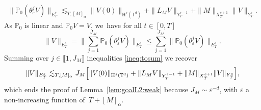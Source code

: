 \documentclass[JEP,XML,SOM,Unicode,published]{cedram}
\theoremstyle{definition}
\newcommand\T{\mathbb{T}}
\renewcommand\H{\mathrm{H}}
\let\ep\varepsilon
\begin{document}
\begin{align}\label{ineq:tosum}
\| \mathbb{P}_0(\theta_\ep^j V)\|_{E_T^s} \lesssim_{T,[M]_\alpha} \|V(0)\|_{\H^s(\T^d)} + \|L_M V\|_{Y_T^{s-1}} + \|M\|_{X_T^{s+1}}\|V\|_{Y_T^s}.
\end{align}
As $\mathbb{P}_0$ is linear and $\mathbb{P}_0 V = V$, we~have for all $t\in[0,T]$
\[
\|V\|_{E_T^s} = \biggl\|\sum_{j=1}^{J_M} \mathbb{P}_0(\theta_\ep^j V)\biggr\|_{E^s_T} \leq \sum_{j=1}^{J_M} \|\mathbb{P}_0(\theta_\ep^j V)\|_{E_T^s}.
\]
Summing over $j\in\llbracket 1,J_M\rrbracket$ inequalities \eqref{ineq:tosum} we recover
\[
\|V\|_{E_T^s} \lesssim_{T,[M]_\alpha} J_M \Bigl[\|V(0)\|_{\H^s(\T^d)} + \|L_M V\|_{Y_T^{s-1}} + \|M\|_{X_T^{s+1}}\|V\|_{Y_T^s}\Bigr],
\]
which ends the proof of Lemma~\ref{lem:goalL2:weak} because $J_M\sim \ep^{-d}$, with $\ep$ a non-increasing function of~$T+[M]_\alpha$.
\end{document}
